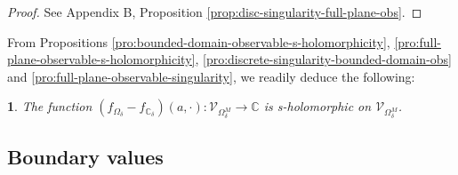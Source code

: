 \documentclass[oneside,english]{amsart}
\numberwithin{equation}{section}
\numberwithin{figure}{section}
\theoremstyle{plain}
\theoremstyle{plain}
\theoremstyle{plain}
\theoremstyle{plain}
\newtheorem{prop}[thm]{\protect\propositionname}
\theoremstyle{plain}
\theoremstyle{definition}
\theoremstyle{remark}
\providecommand{\propositionname}{Proposition}
\begin{document}
\begin{proof}
See Appendix B, Proposition \ref{prop:disc-singularity-full-plane-obs}.
\end{proof}
From Propositions \ref{pro:bounded-domain-observable-s-holomorphicity},
\ref{pro:full-plane-observable-s-holomorphicity}, \ref{pro:discrete-singularity-bounded-domain-obs}
and \ref{pro:full-plane-observable-singularity}, we readily deduce
the following:
\begin{prop}
\label{pro:boundary-effect-observable-s-holomorphicity}The function
$\left(f_{\Omega_{\delta}}-f_{\mathbb{C}_{\delta}}\right)\left(a,\cdot\right):\mathcal{V}_{\Omega_{\delta}^{M}}\to\mathbb{C}$
is s-holomorphic on $\mathcal{V}_{\Omega_{\delta}^{M}}$. 
\end{prop}

\subsection{Boundary values}
\end{document}
